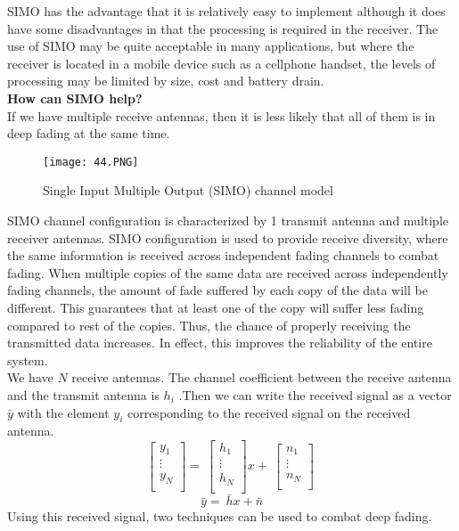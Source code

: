 SIMO has the advantage that it is relatively easy to implement although it does have some disadvantages in that the processing is required in the receiver. The use of SIMO may be quite acceptable in many applications, but where the receiver is located in a mobile device such as a cellphone handset, the levels of processing may be limited by size, cost and battery drain. \\

\textbf{How can SIMO help?}\\
If we have multiple receive antennas, then it is less likely that all of them is in deep fading at the same time.
\begin{figure}[h]
\centering
\texttt{[image: 44.PNG]}
\caption{Single Input Multiple Output (SIMO) channel model}
\label{fig:SIMO}
\end{figure}

SIMO channel configuration is characterized by 1 transmit antenna and multiple receiver antennas. SIMO configuration is used to provide receive diversity, where the same information is received across independent fading channels to combat fading. When multiple copies of the same data are received across independently fading channels, the amount of fade suffered by each copy of the data will be different. This guarantees that at least one of the copy will suffer less fading compared to rest of the copies. Thus, the chance of properly receiving the transmitted data increases. In effect, this improves the reliability of the entire system. \\
We have $N$ receive antennas. The channel coefficient between the receive antenna and the transmit antenna is $h_i$ .Then we can write the received signal as a vector $\bar{y}$ with the element $y_i$ corresponding to the received signal on the received antenna.
\[\left[\begin{matrix}y_1\\\vdots\\y_N\\\end{matrix}\right]=\ \left[\begin{matrix}h_1\\\vdots\\h_N\\\end{matrix}\right]x+\ \left[\begin{matrix}n_1\\\vdots\\n_N\\\end{matrix}\right]\  \]
\[\bar{y}=\ \bar{h}x+\bar{n}\]
Using this received signal, two techniques can be used to combat deep fading.

